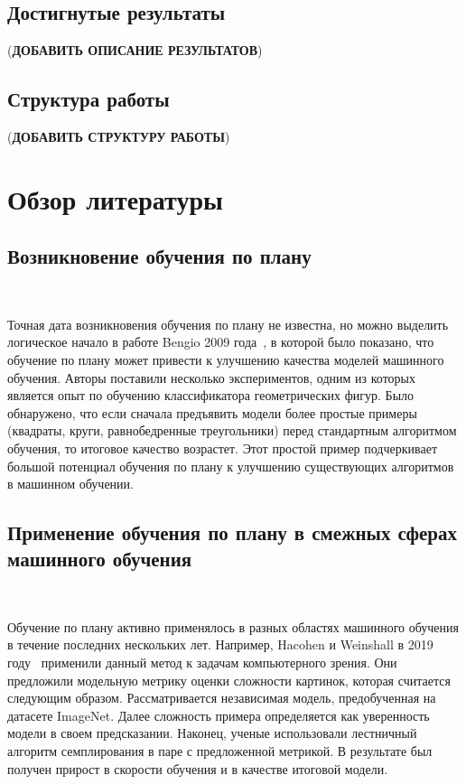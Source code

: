 \documentclass{spbau-diploma}
\begin{document}
\subsection*{Достигнутые результаты}
({\bf ДОБАВИТЬ ОПИСАНИЕ РЕЗУЛЬТАТОВ})
\subsection*{Структура работы}
({\bf ДОБАВИТЬ СТРУКТУРУ РАБОТЫ})
\section{Обзор литературы} \label{sec:literature}
\subsection{Возникновение обучения по плану}
\ 

Точная дата возникновения обучения по плану не известна, но можно выделить логическое начало в работе Bengio 2009 года~\cite{bengio2009curriculum}, в которой было показано, что обучение по плану может привести к улучшению качества моделей машинного обучения. Авторы поставили несколько экспериментов, одним из которых является опыт по обучению классификатора геометрических фигур. Было обнаружено, что если сначала предъявить модели более простые примеры (квадраты, круги, равнобедренные треугольники) перед стандартным алгоритмом обучения, то итоговое качество возрастет. Этот простой пример подчеркивает большой потенциал обучения по плану к улучшению существующих алгоритмов в машинном обучении.
\subsection{Применение обучения по плану в смежных сферах машинного обучения}
\ 

Обучение по плану активно применялось в разных областях машинного обучения в течение последних нескольких лет. Например, Hacohen и Weinshall в 2019 году~\cite{hacohen2019power} применили данный метод к задачам компьютерного зрения. Они предложили модельную метрику оценки сложности картинок, которая считается следующим образом. Рассматривается независимая модель, предобученная на датасете ImageNet. Далее сложность примера определяется как уверенность модели в своем предсказании. Наконец, ученые использовали лестничный алгоритм семплирования в паре с предложенной метрикой. В результате был получен прирост в скорости обучения и в качестве итоговой модели.
\end{document}
